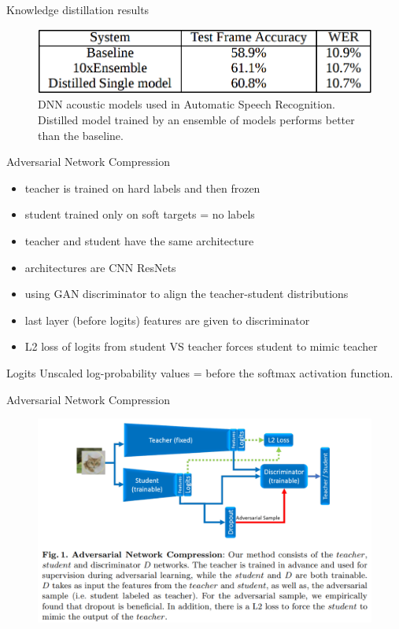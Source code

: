 \documentclass{beamer}
\begin{document}
\begin{frame}{Knowledge distillation results}

\begin{figure}[h]
\includegraphics[width=\textwidth]{img/distilled_result}
\caption{DNN acoustic models used in Automatic Speech Recognition. Distilled model trained by an ensemble of models performs better than the baseline. \cite{cit:distill}}
\end{figure}

\end{frame}
\begin{frame}{Adversarial Network Compression}

\begin{itemize}
\item teacher is trained on hard labels and then frozen
\item student trained only on soft targets = no labels
\item teacher and student have the same architecture
\item architectures are CNN ResNets
\item using GAN discriminator to align the teacher-student distributions
\item last layer (before logits) features are given to discriminator
\item L2 loss of logits from student VS teacher forces student to mimic teacher 
\end{itemize}

\begin{block}{Logits}
Unscaled log-probability values = before the softmax
activation function.
\end{block}


\end{frame}
\begin{frame}{Adversarial Network Compression}

\begin{figure}[h]
\includegraphics[width=\textwidth]{img/GAN_distill}
\end{figure}

\end{frame}
\end{document}
